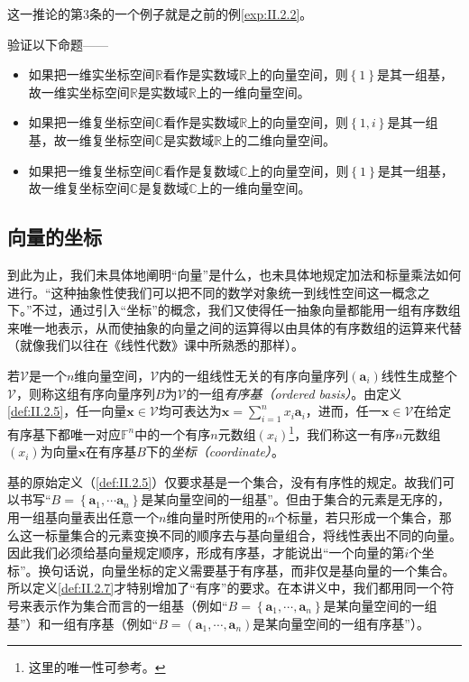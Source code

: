 \documentclass[../main.tex]{subfiles}
\begin{document}
这一推论的第3条的一个例子就是之前的例\ref{exp:II.2.2}。

\begin{example}
    验证以下命题——
    \begin{itemize}
        \item 如果把一维实坐标空间$\mathbb{R}$看作是实数域$\mathbb{R}$上的向量空间，则$\left\{1\right\}$是其一组基，故一维实坐标空间$\mathbb{R}$是实数域$\mathbb{R}$上的一维向量空间。
        \item 如果把一维复坐标空间$\mathbb{C}$看作是实数域$\mathbb{R}$上的向量空间，则$\left\{1,i\right\}$是其一组基，故一维复坐标空间$\mathbb{C}$是实数域$\mathbb{R}$上的二维向量空间。
        \item 如果把一维复坐标空间$\mathbb{C}$看作是复数域$\mathbb{C}$上的向量空间，则$\left\{1\right\}$是其一组基，故一维复坐标空间$\mathbb{C}$是复数域$\mathbb{C}$上的一维向量空间。
    \end{itemize}
\end{example}

\subsection{向量的坐标}
到此为止，我们未具体地阐明“向量”是什么，也未具体地规定加法和标量乘法如何进行。“这种抽象性使我们可以把不同的数学对象统一到线性空间这一概念之下。”\cite[p.~167]{周胜林2012线性代数}不过，通过引入“坐标”的概念，我们又使得任一抽象向量都能用一组有序数组来唯一地表示，从而使抽象的向量之间的运算得以由具体的有序数组的运算来代替（就像我们以往在《线性代数》课中所熟悉的那样）。

\begin{definition}[向量在给定有序基下的坐标]\label{def:II.2.7}若$\mathcal{V}$是一个$n$维向量空间，$\mathcal{V}$内的一组线性无关的有序向量序列$\left(\mathbf{a}_i\right)$线性生成整个$\mathcal{V}$，则称这组有序向量序列$B$为$\mathcal{V}$的一组\emph{有序基（ordered basis）}。由定义\ref{def:II.2.5}，任一向量$\mathbf{x}\in\mathcal{V}$均可表达为$\mathbf{x}=\sum_{i=1}^nx_i\mathbf{a}_i$，进而，任一$\mathbf{x}\in\mathcal{V}$在给定有序基下都唯一对应$\mathbb{F}^n$中的一个有序$n$元数组$\left(x_i\right)$\footnote{这里的唯一性可参考\cite[\S 7.2定义2.3下“(3)的证明”]{周胜林2012线性代数}。}，我们称这一有序$n$元数组$\left(x_i\right)$为向量$\mathbf{x}$在有序基$B$下的\emph{坐标（coordinate）}。
\end{definition}

基的原始定义（\ref{def:II.2.5}）仅要求基是一个集合，没有有序性的规定。故我们可以书写“$B=\left\{\mathbf{a}_1,\cdots\mathbf{a}_n\right\}$是某向量空间的一组基”。但由于集合的元素是无序的，用一组基向量表出任意一个$n$维向量时所使用的$n$个标量，若只形成一个集合，那么这一标量集合的元素变换不同的顺序去与基向量组合，将线性表出不同的向量。因此我们必须给基向量规定顺序，形成有序基，才能说出“一个向量的第$i$个坐标”。换句话说，向量坐标的定义需要基于有序基，而非仅是基向量的一个集合。所以定义\ref{def:II.2.7}才特别增加了“有序”的要求。在本讲义中，我们都用同一个符号来表示作为集合而言的一组基（例如“$B=\left\{\mathbf{a}_1,\cdots,\mathbf{a}_n\right\}$是某向量空间的一组基”）和一组有序基（例如“$B=\left(\mathbf{a}_1,\cdots,\mathbf{a}_n\right)$是某向量空间的一组有序基”）。
\end{document}
